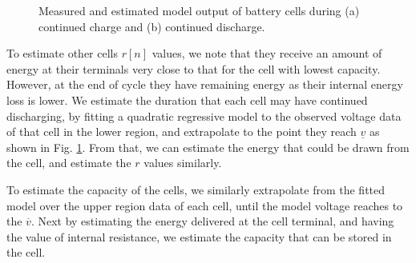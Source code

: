 \documentclass[10pt,twocolumn]{IEEEtran}
\begin{document}
\begin{figure}[t]
\centering
\vspace{-0.2cm}
{} \vspace{-0.1cm}
\caption{Measured and estimated model output of  battery cells during  (a) continued charge  and (b) continued discharge.}
\vspace{-0.3cm}
\label{fig:voltagestimate}
\end{figure}



To estimate other cells $r[n]$ values, we note that they receive an amount of energy at their terminals very close to that for the cell with lowest capacity.
However, at the end of cycle they have remaining energy as their internal energy loss is lower.
We estimate the duration that each cell may have continued discharging, by fitting a quadratic regressive model to the observed voltage data of that cell in the lower region, and extrapolate to the point they reach $\underline{v}$ as shown in Fig. \ref{fig:voltagestimate}.
From that, we can estimate the energy that could be drawn from the cell, and estimate the $r$ values similarly.

To estimate the capacity of the cells, we similarly extrapolate from the fitted model over the upper region data of each cell, until the model voltage reaches to the $\overline{v}$.
Next by estimating the energy delivered at the cell terminal, and having the value of internal resistance, we estimate the capacity that can be stored in the cell.
\end{document}
